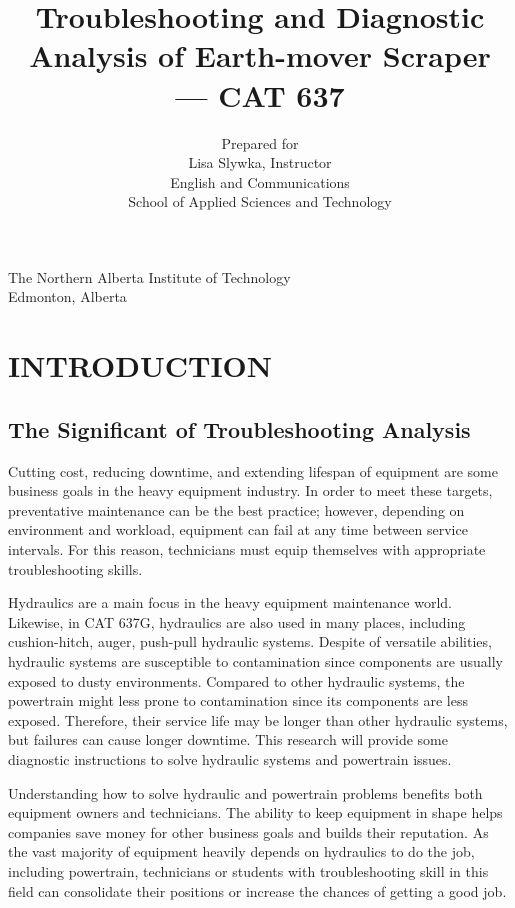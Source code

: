 \documentclass[a4paper,man,natbib]{apa6}
\title{Troubleshooting and Diagnostic Analysis of Earth-mover Scraper --- CAT 637}
\author{Prepared for

Lisa Slywka, Instructor

English and Communications

School of Applied Sciences and Technology
}
\affiliation{Prepared by

Tai Tran, 200222333

Industrial Heavy Equipment Technician Program

School of Applied Trades

October 31, 2016
}
\begin{document}
\centering The Northern Alberta Institute of Technology\\ Edmonton, Alberta

\maketitle

\tableofcontents
\newpage

\listoffigures
\newpage

\listoftables
\newpage



\section{INTRODUCTION}

\subsection{The Significant of Troubleshooting Analysis}

Cutting cost, reducing downtime, and extending lifespan of equipment are some business goals in the heavy equipment industry. In order to meet these targets, preventative maintenance can be the best practice; however, depending on environment and workload, equipment can fail at any time between service intervals. For this reason, technicians must equip themselves with appropriate troubleshooting skills.

Hydraulics are a main focus in the heavy equipment maintenance world. Likewise, in CAT 637G, hydraulics are also used in many places, including cushion-hitch, auger, push-pull hydraulic systems. Despite of versatile abilities, hydraulic systems are susceptible to contamination since components are usually exposed to dusty environments. Compared to other hydraulic systems, the powertrain might less prone to contamination since its components are less exposed. Therefore, their service life may be longer than other hydraulic systems, but failures can cause longer downtime. This research will provide some diagnostic instructions to solve hydraulic systems and powertrain issues.

Understanding how to solve hydraulic and powertrain problems benefits both equipment owners and technicians. The ability to keep equipment in shape helps companies save money for other business goals and builds their reputation. As the vast majority of equipment heavily depends on hydraulics to do the job, including powertrain, technicians or students with troubleshooting skill in this field can consolidate their positions or increase the chances of getting a good job.
\end{document}

